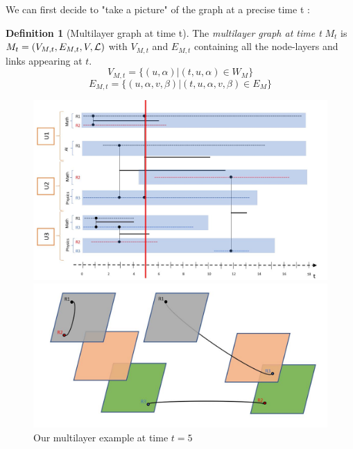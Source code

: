 \documentclass[dvipsnames,a4paper,11pt]{article}
\theoremstyle{definition}
\newtheorem{defn}{Definition}
\theoremstyle{remark}
\theoremstyle{remark}
\begin{document}
	We can first decide to "take a picture" of the graph at a precise time t :
	\begin{defn}[Multilayer graph at time t]
   	The {\em multilayer graph at time t} $M_t$ is $M_t = (V_{M,t}, E_{M,t},V,{\cal L})$ with $V_{M,t}$ and $E_{M,t}$ containing all the node-layers and links appearing at $t$.
   	$$ V_{M,t} = \{ (u,\alpha) | (t,u,\alpha) \in W_M\} $$
   	$$ E_{M,t} = \{(u,\alpha,v,\beta) | (t,u,\alpha,v,\beta) \in E_M\}$$

   \end{defn}

	\begin{figure}[h]
		\begin{minipage}{0.49\linewidth}
			\includegraphics[width=\textwidth]{schemas/pauset.jpg}
		\end{minipage}
		\begin{minipage}{0.49\linewidth}
			\includegraphics[width=\textwidth]{schemas/pausetproj.jpg}
		\end{minipage}
		\caption{Our multilayer example at time $t=5$}
	\end{figure}
\end{document}

